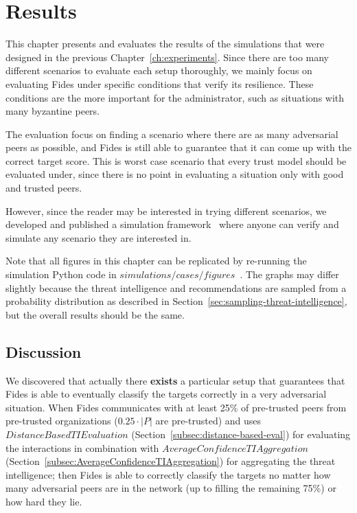 \chapter{Results}
\label{ch:results}
This chapter presents and evaluates the results of the simulations that were designed in the previous Chapter~\ref{ch:experiments}. Since there are too many different scenarios to evaluate each setup thoroughly, we mainly focus on evaluating Fides under specific conditions that verify its resilience. These conditions are the more important for the administrator, such as situations with many byzantine peers.

The evaluation focus on finding a scenario where there are as many adversarial peers as possible, and Fides is still able to guarantee that it can come up with the correct target score. This is worst case scenario that every trust model should be evaluated under, since there is no point in evaluating a situation only with good and trusted peers.

However, since the reader may be interested in trying different scenarios, we developed and published a simulation framework~\cite{fidesGithub} where anyone can verify and simulate any scenario they are interested in.

Note that all figures in this chapter can be replicated by re-running the simulation Python code in $simulations/cases/figures$~\cite{fidesGithub}.
The graphs may differ slightly because the threat intelligence and recommendations are sampled from a probability distribution as described in Section~\ref{sec:sampling-threat-intelligence}, but the overall results should be the same.








\section{Discussion}
We discovered that actually there \textbf{exists} a particular setup that guarantees that Fides is able to eventually classify the targets correctly in a very adversarial situation. When Fides communicates with at least 25\% of pre-trusted peers from pre-trusted organizations ($0.25 \cdot |P|$ are pre-trusted) and uses $DistanceBasedTIEvaluation$ (Section~\ref{subsec:distance-based-eval}) for evaluating the interactions in combination with $AverageConfidenceTIAggregation$ (Section~\ref{subsec:AverageConfidenceTIAggregation}) for aggregating the threat intelligence; then Fides is able to correctly classify the targets no matter how many adversarial peers are in the network (up to filling the remaining 75\%) or how hard they lie.

